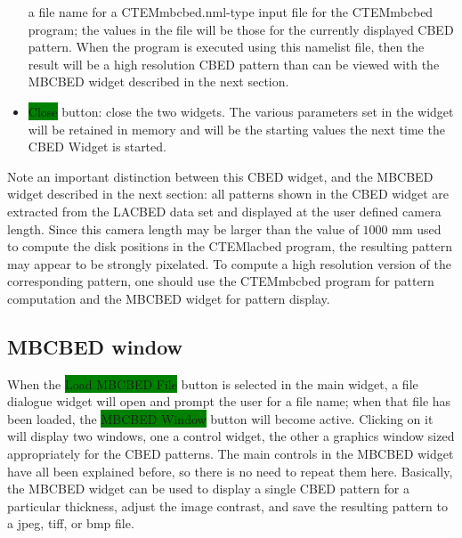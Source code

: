 \documentclass[DIV=calc, paper=letter, fontsize=11pt]{scrartcl}	 %
\newcommand{\button}[1]{\colorbox{green}{\textsf{#1}} button}
\begin{document}
\begin{itemize}
	a file name for a \textsf{CTEMmbcbed.nml}-type input file for the \textsf{CTEMmbcbed} program; the values in the file will be
	those for the currently displayed CBED pattern.  When the program is executed using this namelist file, then the result will be 
	a high resolution CBED pattern than can be viewed with the \textsf{MBCBED} widget described in the next section.  
	\item \button{Close}: close the two widgets.  The various parameters set in the widget will be retained in memory and 
	will be the starting values the next time the CBED Widget is started.
\end{itemize}

Note an important distinction between this CBED widget, and the MBCBED widget described in the next section: all patterns shown in the 
CBED widget are extracted from the LACBED data set and displayed at the user defined camera length.  Since this camera length may 
be larger than the value of $1000$ mm used to compute the disk positions in the \textsf{CTEMlacbed} program, the resulting pattern
may appear to be strongly pixelated.  To compute a high resolution version of the corresponding pattern, one should use the \textsf{CTEMmbcbed} 
program for pattern computation and the MBCBED widget for pattern display.


\subsection{MBCBED window\label{sec:idlcbed}}
When the \button{Load MBCBED File} is selected in the main widget, a file dialogue widget will open and prompt the user for a
file name; when that file has been loaded, the \button{MBCBED Window} will become active.  Clicking on it will display
two windows, one a control widget, the other a graphics window sized appropriately for the CBED patterns.  The main controls
in the \textsf{MBCBED} widget have all been explained before, so there is no need to repeat them here.  Basically, the MBCBED
widget can be used to display a single CBED pattern for a particular thickness, adjust the image contrast, and save the 
resulting pattern to a jpeg, tiff, or bmp file.
\end{document}
